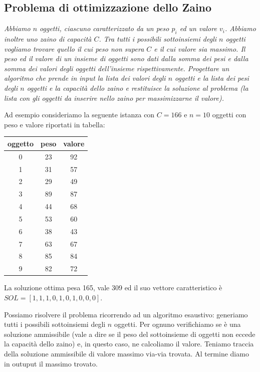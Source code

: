 \subsection{Problema di ottimizzazione dello Zaino}
\textit{Abbiamo $n$ oggetti, ciascuno caratterizzato da un peso $p_i$ ed un valore $v_i$. Abbiamo inoltre uno zaino di capacità $C$. Tra tutti i possibili sottoinsiemi degli $n$ oggetti vogliamo trovare quello il cui peso non supera $C$ e il cui valore sia massimo. Il peso ed il valore di un insieme di oggetti sono dati dalla somma dei pesi e dalla somma dei valori degli oggetti dell’insieme rispettivamente. Progettare un algoritmo che prende in input la lista dei valori degli $n$ oggetti e la lista dei pesi degli $n$ oggetti e la capacità dello zaino e restituisce la soluzione al problema (la lista con gli oggetti da inserire nello zaino per massimizzarne il valore).}

Ad esempio consideriamo la seguente istanza con $C=166$ e $n= 10$ oggetti con peso e valore riportati in tabella:

\begin{center}
\begin{tabular}{|c|c|c|}
     \hline
    \textbf{oggetto}& \textbf{peso}& \textbf{valore}\\\hline
    0&23&92\\\hline
    1&31&57\\\hline
    2&29&49\\\hline
    3&89&87\\\hline
    4&44&68\\\hline
    5&53&60\\\hline
    6&38&43\\\hline
    7&63&67\\\hline
    8&85&84\\\hline
    9&82&72\\\hline
\end{tabular}
\end{center}

La soluzione ottima pesa 165, vale 309 ed il suo vettore caratteristico è $SOL=[1, 1, 1, 0, 1, 0, 1, 0, 0, 0]$.

Possiamo risolvere il problema ricorrendo ad un algoritmo esaustivo: generiamo tutti i possibili sottoinsiemi degli $n$ oggetti. Per ognuno verifichiamo se è una soluzione ammissibile (vale a dire se il peso del sottoinsieme di oggetti non eccede la capacità dello zaino) e, in questo caso, ne calcoliamo il valore. Teniamo traccia della soluzione ammissibile di valore massimo via-via trovata. Al termine diamo in outuput il massimo trovato.

